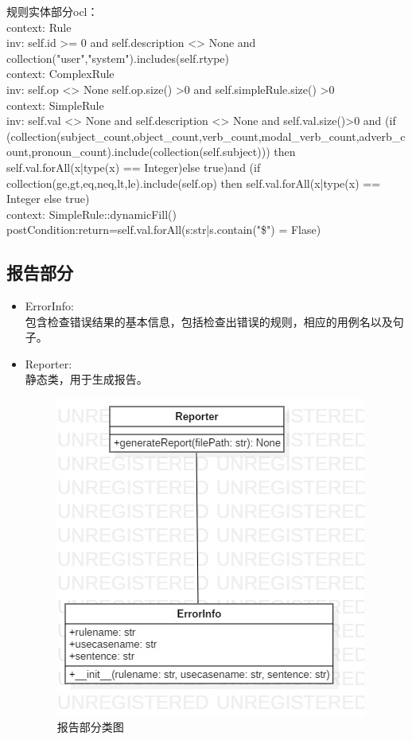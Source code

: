     规则实体部分ocl：\\
    context: Rule\\
    inv: self.id >= 0 and self.description <> None and collection("user","system").includes(self.rtype)\\    
    context: ComplexRule\\
    inv: self.op <> None self.op.size() >0 and self.simpleRule.size() >0\\
    context: SimpleRule\\
    inv: self.val <> None and self.description <> None and self.val.size()>0 and 
    (if (collection(subject\_count,object\_count,verb\_count,modal\_verb\_count,adverb\_count,pronoun\_count).include(collection(self.subject))) then self.val.forAll(x|type(x) == Integer)else true)and
    (if collection(ge,gt,eq,neq,lt,le).include(self.op) then self.val.forAll(x|type(x) == Integer else true)\\
    context: SimpleRule::dynamicFill()\\
    postCondition:return=self.val.forAll(s:str|s.contain("\$") = Flase)
	
    \subsection{报告部分}
    \begin{itemize}
    	\item 	ErrorInfo:\\
    	包含检查错误结果的基本信息，包括检查出错误的规则，相应的用例名以及句子。
    	\item	Reporter:\\
    	静态类，用于生成报告。
    	\begin{figure}
    		\centering
    		\includegraphics[width=.5\textwidth]{./src/classDiagram_report.jpg} 
    		\caption{报告部分类图} 
    	\end{figure}
    \end{itemize}
	
